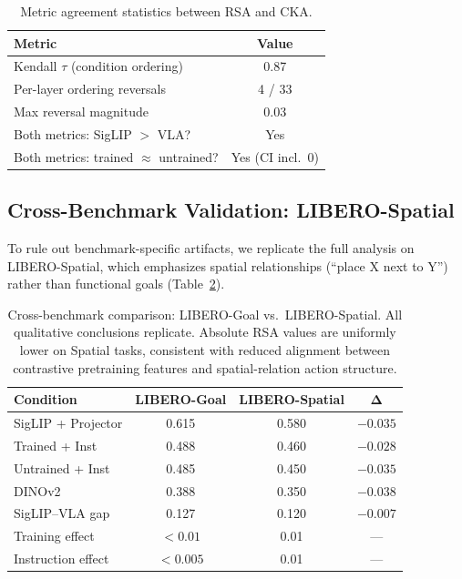 \documentclass[letterpaper]{article}
\begin{document}
\begin{table}[t]
\centering
\caption{Metric agreement statistics between RSA and CKA.}
\label{tab:metric_agreement}
\begin{tabular}{lc}
\toprule
\textbf{Metric} & \textbf{Value} \\
\midrule
Kendall $\tau$ (condition ordering) & 0.87 \\
Per-layer ordering reversals & 4 / 33 \\
Max reversal magnitude & 0.03 \\
Both metrics: SigLIP $>$ VLA? & Yes \\
Both metrics: trained $\approx$ untrained? & Yes (CI incl.\ 0) \\
\bottomrule
\end{tabular}
\end{table}

\subsection{Cross-Benchmark Validation: LIBERO-Spatial}
\label{sec:exp_spatial}

To rule out benchmark-specific artifacts, we replicate the full analysis on LIBERO-Spatial, which emphasizes spatial relationships (``place X next to Y'') rather than functional goals (Table~\ref{tab:spatial}).

\begin{table}[t]
\centering
\caption{Cross-benchmark comparison: LIBERO-Goal vs.\ LIBERO-Spatial. All qualitative conclusions replicate. Absolute RSA values are uniformly lower on Spatial tasks, consistent with reduced alignment between contrastive pretraining features and spatial-relation action structure.}
\label{tab:spatial}
\begin{tabular}{lccc}
\toprule
\textbf{Condition} & \textbf{LIBERO-Goal} & \textbf{LIBERO-Spatial} & $\boldsymbol{\Delta}$ \\
\midrule
SigLIP + Projector & 0.615 & 0.580 & $-0.035$ \\
Trained + Inst & 0.488 & 0.460 & $-0.028$ \\
Untrained + Inst & 0.485 & 0.450 & $-0.035$ \\
DINOv2 & 0.388 & 0.350 & $-0.038$ \\
\midrule
SigLIP--VLA gap & 0.127 & 0.120 & $-0.007$ \\
Training effect & $<0.01$ & 0.01 & --- \\
Instruction effect & $<0.005$ & 0.01 & --- \\
\bottomrule
\end{tabular}
\end{table}
\end{document}
